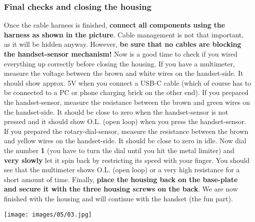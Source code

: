 \documentclass[]{article}
\begin{document}
\subsubsection{Final checks and closing the housing}
\begin{minipage}[t]{0.4\linewidth}
	\vspace{0pt}
	Once the cable harness is finished, \textbf{connect all components using the harness as shown in the picture}. Cable management is not that important, as it will be hidden anyway. However, \textbf{be sure that no cables are blocking the handset-sensor mechanism!}
	\newline
	\newline
	Now is a good time to check if you wired everything up correctly before closing the housing. If you have a multimeter, measure the voltage between the brown and white wires on the handset-side. It should show approx. 5V when you connect a USB-C cable (which of course has to be connected to a PC or phone charging brick on the other end).
	\newline
	\newline
	If you prepared the handset-sensor, measure the resistance between the brown and green wires on the handset-side. It should be close to zero when the handset-sensor is not pressed and it should show O.L. (open loop) when you press the handset-sensor.
	\newline
	\newline
	If you prepared the rotary-dial-sensor, measure the resistance between the brown and yellow wires on the handset-side. It should be close to zero in idle. Now dial the number \textbf{1} (you have to turn the dial until you hit the metal limiter) and \textbf{very slowly} let it spin back by restricting its speed with your finger. You should see that the multimeter shows O.L. (open loop) or a very high resistance for a short amount of time.
	\newline
	\newline
	Finally, \textbf{place the housing back on the base-plate and secure it with the three housing screws on the back}. We are now finished with the housing and will continue with the handset (the fun part).
\end{minipage}
\hfill
\begin{minipage}[t]{0.5\linewidth}
	\vspace{0pt}
	\texttt{[image: images/05/03.jpg]}
\end{minipage}


\newpage
\end{document}
